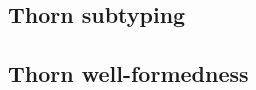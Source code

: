\documentclass[acmlarge, anonymous, authordraft]{acmart}
\begin{document}
\subsection{Thorn subtyping}


\begin{mathpar}

\end{mathpar}

\begin{mathpar}


\end{mathpar}

\begin{mathpar}
\end{mathpar}

\subsection{Thorn well-formedness}


\begin{mathpar}
\end{mathpar}


\begin{mathpar}
\end{mathpar}
\end{document}
